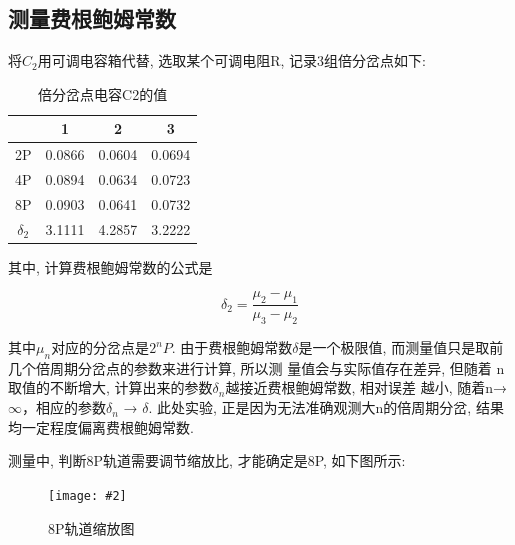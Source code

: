 \documentclass[12pt,a4paper]{article}
\newcommand{\be}[1]{
    \begin{equation}
        #1
    \end{equation}
}
\newcommand{\bfig}[3]{
    \begin{figure}[H]
        \centering
        \texttt{[image: \#2]}
        \caption{#3}
    \end{figure}
}
\begin{document}
\subsection{测量费根鲍姆常数}
将$C_2$用可调电容箱代替, 选取某个可调电阻R, 记录3组倍分岔点如下: 
\begin{table}[H]
    \centering
    \begin{tabular}{|c|c|c|c|}
    \hline
           & 1      & 2      & 3      \\ \hline
    2P     & 0.0866 & 0.0604 & 0.0694 \\ \hline
    4P     & 0.0894 & 0.0634 & 0.0723 \\ \hline
    8P     & 0.0903 & 0.0641 & 0.0732 \\ \hline
    $\delta_{2}$ & 3.1111 & 4.2857 & 3.2222 \\ \hline
    \end{tabular}
    \caption{倍分岔点电容C2的值}
    \end{table}
其中, 计算费根鲍姆常数的公式是
\be{\delta_2=\frac{\mu_2-\mu_1}{\mu_3-\mu_2}}
其中$\mu_n$对应的分岔点是$2^n P$. 
由于费根鲍姆常数$\delta$是一个极限值, 而测量值只是取前几个倍周期分岔点的参数来进行计算, 所以测
量值会与实际值存在差异, 但随着 n 取值的不断增大, 计算出来的参数$\delta_n$越接近费根鲍姆常数, 相对误差
越小, 随着n→ $\infty$，相应的参数$\delta_n$ → $\delta$. 此处实验, 正是因为无法准确观测大n的倍周期分岔, 结果均一定程度偏离费根鲍姆常数. 

测量中, 判断8P轨道需要调节缩放比, 才能确定是8P, 如下图所示:
\bfig{0.7}{8P.jpg}{8P轨道缩放图}
\end{document}

